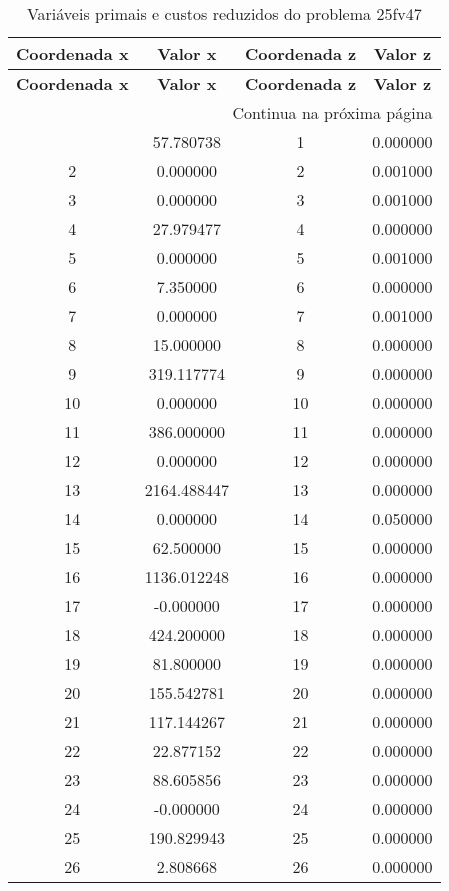 \documentclass[12pt]{article}
\begin{document}
\begin{longtable}{@{}cccc@{}}
\caption{Variáveis primais e custos reduzidos do problema 25fv47} \\
\toprule
\textbf{Coordenada x} & \textbf{Valor x} & \textbf{Coordenada z} & \textbf{Valor z} \\
\midrule
\endfirsthead

\toprule
\textbf{Coordenada x} & \textbf{Valor x} & \textbf{Coordenada z} & \textbf{Valor z} \\
\midrule
\endhead

\midrule \multicolumn{4}{r}{{Continua na próxima página}} \\ \midrule
\endfoot

\bottomrule
\endlastfoot
1 & 57.780738 & 1 & 0.000000 \\
2 & 0.000000 & 2 & 0.001000 \\
3 & 0.000000 & 3 & 0.001000 \\
4 & 27.979477 & 4 & 0.000000 \\
5 & 0.000000 & 5 & 0.001000 \\
6 & 7.350000 & 6 & 0.000000 \\
7 & 0.000000 & 7 & 0.001000 \\
8 & 15.000000 & 8 & 0.000000 \\
9 & 319.117774 & 9 & 0.000000 \\
10 & 0.000000 & 10 & 0.000000 \\
11 & 386.000000 & 11 & 0.000000 \\
12 & 0.000000 & 12 & 0.000000 \\
13 & 2164.488447 & 13 & 0.000000 \\
14 & 0.000000 & 14 & 0.050000 \\
15 & 62.500000 & 15 & 0.000000 \\
16 & 1136.012248 & 16 & 0.000000 \\
17 & -0.000000 & 17 & 0.000000 \\
18 & 424.200000 & 18 & 0.000000 \\
19 & 81.800000 & 19 & 0.000000 \\
20 & 155.542781 & 20 & 0.000000 \\
21 & 117.144267 & 21 & 0.000000 \\
22 & 22.877152 & 22 & 0.000000 \\
23 & 88.605856 & 23 & 0.000000 \\
24 & -0.000000 & 24 & 0.000000 \\
25 & 190.829943 & 25 & 0.000000 \\
26 & 2.808668 & 26 & 0.000000 \\

\end{longtable}
\end{document}
